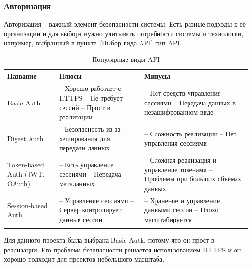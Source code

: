 \documentclass[a4paper,article]{article}
\begin{document}
\begin{sloppypar}
    \subsubsection{Авторизация}
    
    Авторизация -- важный элемент безопасности системы. Есть разные подходы к её организации и для выбора нужно учитывать потребности системы и технологии, например, выбранный в пункте~\ref{Выбор вида API} тип API.

    \begin{xltabular}{\textwidth} { |
            >{\hsize} X |
            >{\hsize} X |
            >{\hsize} X | }
        \hline
        Название & Плюсы & Минусы \\
        \hline
        Basic Auth
        & -- Хорошо работает с HTTPS \newline -- Не требует сессий \newline -- Прост в реализации
        & -- Нет средств управления сессиями \newline -- Передача данных в незашифрованном виде \\
        \hline
        Digest Auth
        & -- Безопасность из-за хеширования для передачи данных
        & -- Сложность реализации \newline -- Нет управления сессиями \\
        \hline
        Token-based Auth \newline (JWT, OAuth)
        & -- Есть управление сессиями \newline -- Передача метаданных
        & -- Сложная реализация и управление токенами \newline -- Проблемы при больших объёмах данных \\
        \hline
        Session-based Auth
        & -- Управление сессиями \newline -- Сервер контролирует данные сессии
        & -- Хранение и управление данными сессии \newline -- Плохо масштабируется \\
        \hline

        \caption{\centering Популярные виды API}

        \label{tab:Авторизация}
    \end{xltabular}

    Для данного проекта была выбрана Basic Auth, потому что он прост в реализации. Его проблема безопасности решается использованием HTTPS и он хорошо подходит для проектов небольшого масштаба.


\end{sloppypar}
\end{document}
